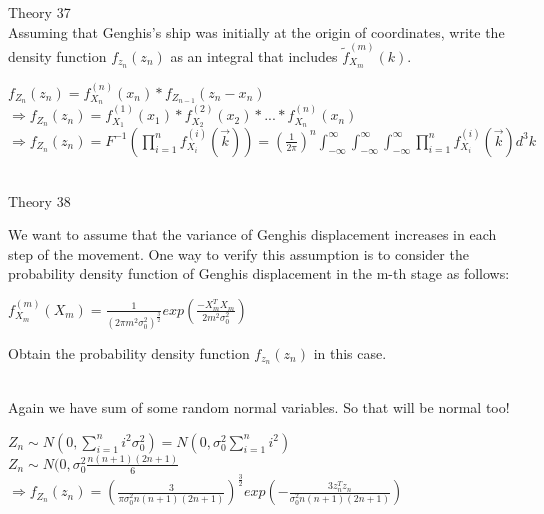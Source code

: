 \documentclass[30pt]{article}
\begin{document}
{\Large \color{blue} Theory 37 } \\
{\color{blue} Assuming that Genghis's ship was initially at the origin of coordinates, write the density function $f_{z_n}(z_n)$ as an integral that includes $\tilde{f}_{X_m}^{(m)}(k) $.
} \\ \newline 
\begin{center}
    $f_{Z_n}(z_n) = f_{X_n}^{(n)}(x_n) * f_{Z_{n-1}}(z_n-x_n)  $ \vspace{0.3cm} \\
    $\Rightarrow f_{Z_n}(z_n) = f_{X_1}^{(1)}(x_1) * f_{X_2}^{(2)}(x_2)* ... * f_{X_n}^{(n)}(x_n) $ \vspace{0.3cm} \\
    $\Rightarrow f_{Z_n}(z_n) = F^{-1}(\prod_{i=1}^{n}f_{X_i}^{(i)}(\Vec{k}) ) = (\frac{1}{2\pi})^n \int_{-\infty}^{\infty}\int_{-\infty}^{\infty}\int_{-\infty}^{\infty}\prod_{i=1}^{n}f_{X_i}^{(i)}(\Vec{k}) d^3 k $
\end{center} \\

{\Large \color{blue} Theory 38 } \\
{\color{blue} We want to assume that the variance of Genghis displacement increases in each step of the movement.
One way to verify this assumption is to consider the probability density function of Genghis displacement in the m-th stage as follows:\\
\begin{center}
    ${f}_{X_m}^{(m)}(X_m) = \frac{1}{(2 \pi m^2 \sigma_0^2)^\frac{3}{2}} exp(\frac{-X_m^T  X_m}{2 m^2 \sigma_0^2})$
\end{center}
Obtain the probability density function $f_{z_n}(z_n)$ in this case.
} \\ \newline 
Again we have sum of some random normal variables. So that will be normal too! \\
\begin{center}
    $Z_n \sim N (0,\sum_{i=1}^{n}i^2\sigma_0^2) = N (0,\sigma_0^2\sum_{i=1}^{n}i^2) $ \vspace{0.3cm} \\
    $Z_n \sim N (0,\sigma_0^2\frac{n(n+1)(2n+1)}{6} $ \vspace{0.3cm} \\
    $\Rightarrow f_{Z_n}(z_n) = (\frac{3}{\pi\sigma_0^2n(n+1)(2n+1)})^{\frac{3}{2}} exp(- \frac{3z_n^T z_n}{\sigma_0^2n(n+1)(2n+1)}) $
\end{center}
\end{document}
